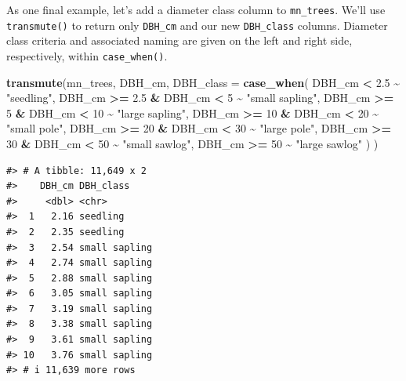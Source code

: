 \documentclass[
  11pt,
]{krantz}
\newenvironment{Shaded}{\begin{snugshade}}{\end{snugshade}}
\newcommand{\DataTypeTok}[1]{\textcolor[rgb]{0.13,0.29,0.53}{#1}}
\newcommand{\DecValTok}[1]{\textcolor[rgb]{0.00,0.00,0.81}{#1}}
\newcommand{\FloatTok}[1]{\textcolor[rgb]{0.00,0.00,0.81}{#1}}
\newcommand{\KeywordTok}[1]{\textcolor[rgb]{0.13,0.29,0.53}{\textbf{#1}}}
\newcommand{\NormalTok}[1]{#1}
\newcommand{\OperatorTok}[1]{\textcolor[rgb]{0.81,0.36,0.00}{\textbf{#1}}}
\newcommand{\StringTok}[1]{\textcolor[rgb]{0.31,0.60,0.02}{#1}}
\theoremstyle{definition}
\theoremstyle{definition}
\theoremstyle{definition}
\theoremstyle{definition}
\theoremstyle{remark}
\begin{document}
As one final example, let's add a diameter class column to \texttt{mn\_trees}. We'll use \texttt{transmute()} to return only \texttt{DBH\_cm} and our new \texttt{DBH\_class} columns. Diameter class criteria and associated naming are given on the left and right side, respectively, within \texttt{case\_when()}.

\begin{Shaded}
\begin{Highlighting}[]
\KeywordTok{transmute}\NormalTok{(mn\_trees, DBH\_cm, }
          \DataTypeTok{DBH\_class =} \KeywordTok{case\_when}\NormalTok{(}
\NormalTok{                      DBH\_cm }\OperatorTok{\textless{}}\StringTok{ }\FloatTok{2.5} \OperatorTok{\textasciitilde{}}\StringTok{ "seedling"}\NormalTok{,}
\NormalTok{                      DBH\_cm }\OperatorTok{\textgreater{}=}\StringTok{ }\FloatTok{2.5} \OperatorTok{\&}\StringTok{ }\NormalTok{DBH\_cm }\OperatorTok{\textless{}}\StringTok{ }\DecValTok{5} \OperatorTok{\textasciitilde{}}\StringTok{ "small sapling"}\NormalTok{,}
\NormalTok{                      DBH\_cm }\OperatorTok{\textgreater{}=}\StringTok{ }\DecValTok{5} \OperatorTok{\&}\StringTok{ }\NormalTok{DBH\_cm }\OperatorTok{\textless{}}\StringTok{ }\DecValTok{10} \OperatorTok{\textasciitilde{}}\StringTok{ "large sapling"}\NormalTok{,}
\NormalTok{                      DBH\_cm }\OperatorTok{\textgreater{}=}\StringTok{ }\DecValTok{10} \OperatorTok{\&}\StringTok{ }\NormalTok{DBH\_cm }\OperatorTok{\textless{}}\StringTok{ }\DecValTok{20} \OperatorTok{\textasciitilde{}}\StringTok{ "small pole"}\NormalTok{,}
\NormalTok{                      DBH\_cm }\OperatorTok{\textgreater{}=}\StringTok{ }\DecValTok{20} \OperatorTok{\&}\StringTok{ }\NormalTok{DBH\_cm }\OperatorTok{\textless{}}\StringTok{ }\DecValTok{30} \OperatorTok{\textasciitilde{}}\StringTok{ "large pole"}\NormalTok{,}
\NormalTok{                      DBH\_cm }\OperatorTok{\textgreater{}=}\StringTok{ }\DecValTok{30} \OperatorTok{\&}\StringTok{ }\NormalTok{DBH\_cm }\OperatorTok{\textless{}}\StringTok{ }\DecValTok{50} \OperatorTok{\textasciitilde{}}\StringTok{ "small sawlog"}\NormalTok{,}
\NormalTok{                      DBH\_cm }\OperatorTok{\textgreater{}=}\StringTok{ }\DecValTok{50}               \OperatorTok{\textasciitilde{}}\StringTok{ "large sawlog"}
\NormalTok{                    )}
\NormalTok{)}
\end{Highlighting}
\end{Shaded}

\begin{verbatim}
#> # A tibble: 11,649 x 2
#>    DBH_cm DBH_class    
#>     <dbl> <chr>        
#>  1   2.16 seedling     
#>  2   2.35 seedling     
#>  3   2.54 small sapling
#>  4   2.74 small sapling
#>  5   2.88 small sapling
#>  6   3.05 small sapling
#>  7   3.19 small sapling
#>  8   3.38 small sapling
#>  9   3.61 small sapling
#> 10   3.76 small sapling
#> # i 11,639 more rows
\end{verbatim}
\end{document}
